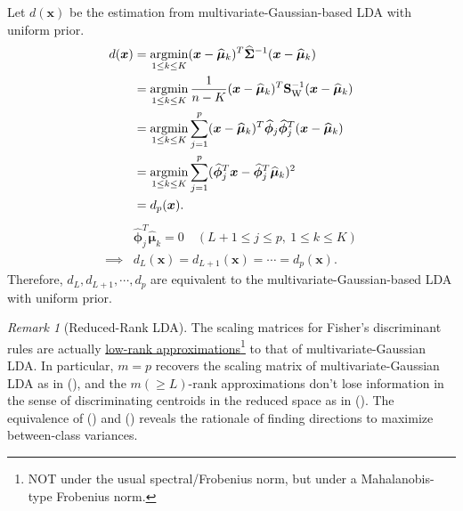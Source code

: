 \documentclass[10pt]{article}
\theoremstyle{definition}
\theoremstyle{remark}
\newtheorem*{rmk}{Remark}
\newcommand{\bx}{\bm{x}}
\newcommand{\Sbb}{\mathbf{S}}
\newcommand{\bmu}{\bm{\mu}}
\newcommand{\bphi}{\bm{\phi}}
\newcommand{\bSigma}{\bm{\Sigma}}
\newcommand{\argmin}{\mathop{\mathrm{argmin}}}
\begin{document}
\begin{enumerate}
\begin{itemize}
\begin{itemize}[leftmargin=*]
			Let $d(\bx)$ be the estimation from multivariate-Gaussian-based LDA with uniform prior.
			\begin{align*}
			    d(\bx) & = \argmin_{1\le k \le K} (\bx-\widehat{\bmu}_{k})^T \widehat{\bSigma}^{-1} (\bx-\widehat{\bmu}_{k}) \\ 
			    & = \argmin_{1\le k \le K} \frac{1}{n-K} (\bx-\widehat{\bmu}_{k})^T \Sbb_{\rm W}^{-1} (\bx-\widehat{\bmu}_{k}) \\
			    & = \argmin_{1\le k \le K} \sum_{j=1}^{p} (\bx-\widehat{\bmu}_{k})^T \widehat{\bphi}_{j}\widehat{\bphi}_{j}^{T} (\bx-\widehat{\bmu}_{k}) \\
			    & = \argmin_{1\le k \le K} \sum_{j=1}^{p} ( \widehat{\bphi}_{j}^{T} \bx-\widehat{\bphi}_{j}^{T}\widehat{\bmu}_{k})^2 \\
			    & = d_p(\bx).
			\end{align*}
			\begin{align*}
			    & \widehat{\bphi}^{T}_{j} \widehat{\bmu}_{k} = 0 \quad(L+1 \le j\le p,\ 1 \le k \le K)  \\
			    \implies & d_L(\bx) = d_{L+1}(\bx) = \cdots = d_p(\bx).
			\end{align*}
			 Therefore, $ d_{L},d_{L+1},\cdots,d_{p} $ are equivalent to the multivariate-Gaussian-based LDA with uniform prior.


		\end{itemize}
		
		\begin{rmk}[Reduced-Rank LDA] The scaling matrices for Fisher's discriminant rules are actually \href{https://en.wikipedia.org/wiki/Low-rank_approximation}{low-rank approximations}\footnote{NOT under the usual spectral/Frobenius norm, but under a Mahalanobis-type Frobenius norm.} to that of multivariate-Gaussian LDA. In particular, $ m = p $ recovers the scaling matrix of multivariate-Gaussian LDA as in (), and the $ m(\ge L) $-rank approximations don't lose information in the sense of discriminating centroids in the reduced space as in (). The equivalence of () and () reveals the rationale of finding directions to maximize between-class variances.
		\end{rmk}
	\end{itemize}
	

\end{enumerate}
\end{document}
